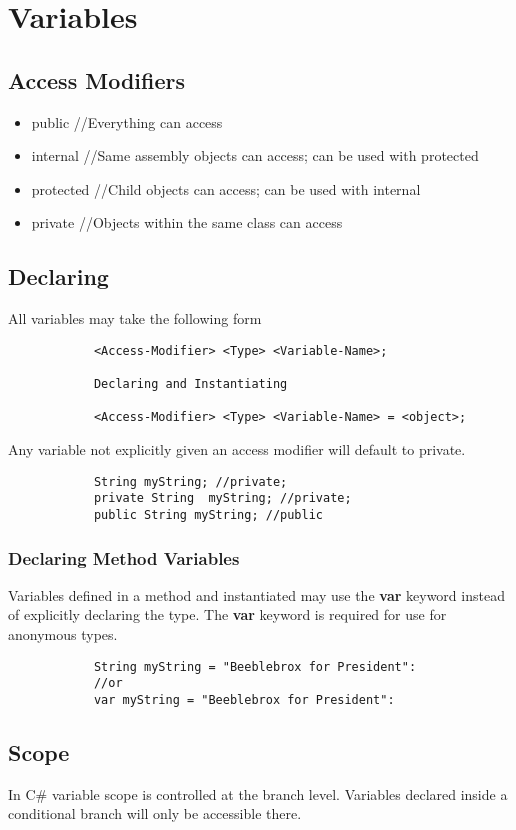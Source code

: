 \documentclass {amsart}
\begin{document}
\section{Variables}
	\subsection{Access Modifiers}
		\begin{itemize}
			\item public 		//Everything can access
			\item internal 	//Same assembly objects can access; can be used with protected
			\item protected	//Child objects can access; can be used with internal
			\item private		//Objects within the same class can access
		\end{itemize}
	\subsection{Declaring}  All variables may take the following form
		\begin{verbatim}
			<Access-Modifier> <Type> <Variable-Name>;

 			Declaring and Instantiating

			<Access-Modifier> <Type> <Variable-Name> = <object>;
		\end{verbatim}
		Any variable not explicitly given an access modifier will default to private. 
		\begin{lstlisting}
			String myString; //private;
			private String  myString; //private;
			public String myString; //public
		\end{lstlisting}

	\subsubsection {Declaring Method Variables}
		Variables defined in a method and instantiated may use the {\bf var} keyword instead of explicitly declaring the type.  The {\bf var} keyword is required for use for anonymous types.
		\begin{lstlisting}
			String myString = "Beeblebrox for President":
			//or 
 			var myString = "Beeblebrox for President":
		\end{lstlisting}
		  

	\subsection {Scope}  In C\# variable scope is controlled at the branch level.  Variables declared inside a conditional branch will only be accessible there. 
\end{document}
